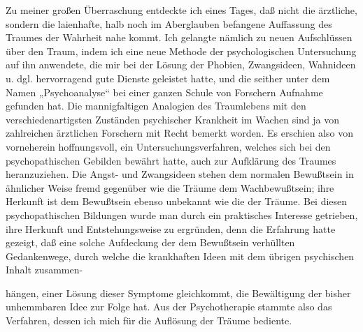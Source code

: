 \documentclass[twoside=true,titlepage=false,open=any, parskip=never, fontsize=10pt, headings=small, chapterprefix=false, appendixprefix=false]{scrbook}
\begin{document}
        \pstart
        Zu meiner großen Überraschung entdeckte ich eines Tages, daß nicht die
               ärztliche, sondern die laienhafte, halb noch im Aberglauben befangene
               Auffassung des Traumes der Wahrheit nahe kommt. Ich gelangte nämlich zu neuen
               Aufschlüssen über den Traum, indem ich eine neue Methode der psychologischen
                  Untersuchung auf ihn anwendete, die mir bei der Lösung der
               Phobien, Zwangsideen, Wahnideen u. dgl. hervorragend gute Dienste geleistet
               hatte, und die seither unter dem Namen „Psychoanalyse“ bei einer ganzen Schule
               von Forschern Aufnahme gefunden hat. Die mannigfaltigen Analogien des
               Traumlebens mit den verschiedenartigsten Zuständen psychischer
               Krankheit im Wachen sind ja von zahlreichen ärztlichen Forschern mit Recht
               bemerkt worden. Es erschien also von vorneherein hoffnungsvoll, ein
               Untersuchungsverfahren, welches sich bei den psychopathischen Gebilden bewährt
               hatte, auch zur Aufklärung des Traumes heranzuziehen. Die Angst- und
               Zwangsideen stehen dem normalen Bewußtsein in ähnlicher Weise fremd gegenüber
               wie die Träume dem Wachbewußtsein; ihre Herkunft ist dem Bewußtsein ebenso
               unbekannt wie die der Träume. Bei diesen psychopathischen Bildungen wurde man
               durch ein praktisches Interesse getrieben, ihre Herkunft und Entstehungsweise zu
               ergründen, denn die Erfahrung hatte gezeigt, daß eine solche Aufdeckung der
               dem Bewußtsein verhüllten Gedankenwege, durch welche die krankhaften Ideen mit dem übrigen psychischen Inhalt zusammen-
        \pend
    
         
            
            
            
        \pstart
        hängen, einer Lösung dieser Symptome gleichkommt, die Bewältigung der bisher unhemmbaren Idee zur Folge hat. Aus der Psychotherapie
               stammte also das Verfahren, dessen ich mich für die Auflösung der Träume
               bediente.
        \pend
    
\end{document}
